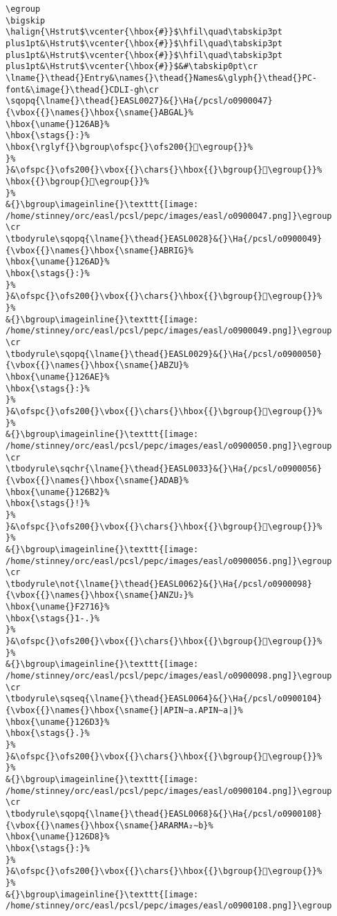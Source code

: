 \begin{verbatim}
\egroup
\bigskip
\halign{\Hstrut$\vcenter{\hbox{#}}$\hfil\quad\tabskip3pt plus1pt&\Hstrut$\vcenter{\hbox{#}}$\hfil\quad\tabskip3pt plus1pt&\Hstrut$\vcenter{\hbox{#}}$\hfil\quad\tabskip3pt plus1pt&\Hstrut$\vcenter{\hbox{#}}$&#\tabskip0pt\cr
\lname{}\thead{}Entry&\names{}\thead{}Names&\glyph{}\thead{}PC-font&\image{}\thead{}CDLI-gh\cr
\sqopq{\lname{}\thead{}EASL0027}&{}\Ha{/pcsl/o0900047}{\vbox{{}\names{}\hbox{\sname{}ABGAL}%
\hbox{\uname{}126AB}%
\hbox{\stags{}:}%
\hbox{\rglyf{}\bgroup\ofspc{}\ofs200{}𒚫\egroup{}}%
}%
}&\ofspc{}\ofs200{}\vbox{{}\chars{}\hbox{{}\bgroup{}𒚫\egroup{}}%
\hbox{{}\bgroup{}𒚬\egroup{}}%
}%
&{}\bgroup\imageinline{}\texttt{[image: /home/stinney/orc/easl/pcsl/pepc/images/easl/o0900047.png]}\egroup
\cr
\tbodyrule\sqopq{\lname{}\thead{}EASL0028}&{}\Ha{/pcsl/o0900049}{\vbox{{}\names{}\hbox{\sname{}ABRIG}%
\hbox{\uname{}126AD}%
\hbox{\stags{}:}%
}%
}&\ofspc{}\ofs200{}\vbox{{}\chars{}\hbox{{}\bgroup{}𒚭\egroup{}}%
}%
&{}\bgroup\imageinline{}\texttt{[image: /home/stinney/orc/easl/pcsl/pepc/images/easl/o0900049.png]}\egroup
\cr
\tbodyrule\sqopq{\lname{}\thead{}EASL0029}&{}\Ha{/pcsl/o0900050}{\vbox{{}\names{}\hbox{\sname{}ABZU}%
\hbox{\uname{}126AE}%
\hbox{\stags{}:}%
}%
}&\ofspc{}\ofs200{}\vbox{{}\chars{}\hbox{{}\bgroup{}𒚮\egroup{}}%
}%
&{}\bgroup\imageinline{}\texttt{[image: /home/stinney/orc/easl/pcsl/pepc/images/easl/o0900050.png]}\egroup
\cr
\tbodyrule\sqchr{\lname{}\thead{}EASL0033}&{}\Ha{/pcsl/o0900056}{\vbox{{}\names{}\hbox{\sname{}ADAB}%
\hbox{\uname{}126B2}%
\hbox{\stags{}!}%
}%
}&\ofspc{}\ofs200{}\vbox{{}\chars{}\hbox{{}\bgroup{}𒚲\egroup{}}%
}%
&{}\bgroup\imageinline{}\texttt{[image: /home/stinney/orc/easl/pcsl/pepc/images/easl/o0900056.png]}\egroup
\cr
\tbodyrule\not{\lname{}\thead{}EASL0062}&{}\Ha{/pcsl/o0900098}{\vbox{{}\names{}\hbox{\sname{}ANZU₂}%
\hbox{\uname{}F2716}%
\hbox{\stags{}1-.}%
}%
}&\ofspc{}\ofs200{}\vbox{{}\chars{}\hbox{{}\bgroup{}󲜖\egroup{}}%
}%
&{}\bgroup\imageinline{}\texttt{[image: /home/stinney/orc/easl/pcsl/pepc/images/easl/o0900098.png]}\egroup
\cr
\tbodyrule\sqseq{\lname{}\thead{}EASL0064}&{}\Ha{/pcsl/o0900104}{\vbox{{}\names{}\hbox{\sname{}|APIN∼a.APIN∼a|}%
\hbox{\uname{}126D3}%
\hbox{\stags{}.}%
}%
}&\ofspc{}\ofs200{}\vbox{{}\chars{}\hbox{{}\bgroup{}𒛓\egroup{}}%
}%
&{}\bgroup\imageinline{}\texttt{[image: /home/stinney/orc/easl/pcsl/pepc/images/easl/o0900104.png]}\egroup
\cr
\tbodyrule\sqopq{\lname{}\thead{}EASL0068}&{}\Ha{/pcsl/o0900108}{\vbox{{}\names{}\hbox{\sname{}ARARMA₂∼b}%
\hbox{\uname{}126D8}%
\hbox{\stags{}:}%
}%
}&\ofspc{}\ofs200{}\vbox{{}\chars{}\hbox{{}\bgroup{}𒛘\egroup{}}%
}%
&{}\bgroup\imageinline{}\texttt{[image: /home/stinney/orc/easl/pcsl/pepc/images/easl/o0900108.png]}\egroup

\end{verbatim}
